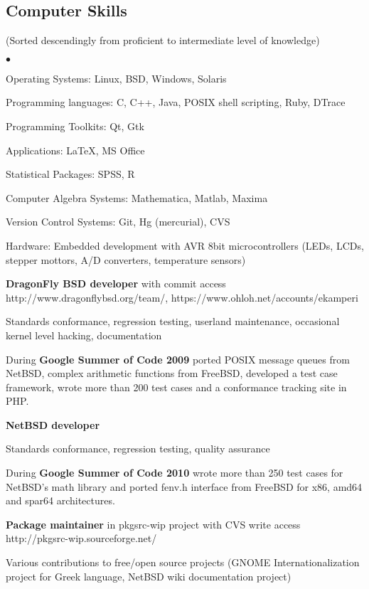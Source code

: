 \documentclass[margin,line]{res}
\newenvironment{list2}{
  \begin{list}{$\bullet$}{%
      \setlength{\itemsep}{0in}
      \setlength{\parsep}{0in} \setlength{\parskip}{0in}
      \setlength{\topsep}{0in} \setlength{\partopsep}{0in}
      \setlength{\leftmargin}{0.2in}}}{\end{list}}
\newenvironment{list3}{
  \begin{list}{
      \setlength{\leftmargin}{0.25in}}}{\end{list}}
\begin{document}
\begin{resume}
\section{\sc Computer Skills}
\small (Sorted descendingly from proficient to intermediate level of knowledge)
\normalsize
\begin{list2}
\item Operating Systems: Linux, BSD, Windows, Solaris
\item Programming languages: C, C++, Java, POSIX shell scripting, Ruby, DTrace
\item Programming Toolkits: Qt, Gtk
\item Applications: \LaTeX, MS Office
\item Statistical Packages: SPSS, R
\item Computer Algebra Systems: Mathematica, Matlab, Maxima
\item Version Control Systems: Git, Hg (mercurial), CVS
\item Hardware: Embedded development with AVR 8bit microcontrollers (LEDs, LCDs,
stepper mottors, A/D converters, temperature sensors)
\item {\bf DragonFly BSD developer} with commit access\\\small http://www.dragonflybsd.org/team/,
https://www.ohloh.net/accounts/ekamperi\normalsize
\begin{list3}
\item Standards conformance, regression testing, userland maintenance,
occasional kernel level hacking, documentation
\item During {\bf Google Summer of Code 2009} ported POSIX message queues from
NetBSD, complex arithmetic functions from FreeBSD, developed a test case
framework, wrote more than 200 test cases and a conformance tracking site in PHP.
\end{list3}
\item {\bf NetBSD developer}
\begin{list3}
\item Standards conformance, regression testing, quality assurance
\item During {\bf Google Summer of Code 2010} wrote more than 250 test cases for
NetBSD's math library and ported fenv.h interface from FreeBSD for x86, amd64 and
spar64 architectures.
\end{list3}
\item {\bf Package maintainer} in pkgsrc-wip project with CVS write access \\http://pkgsrc-wip.sourceforge.net/
\item Various contributions to free/open source projects (GNOME Internationalization project for Greek language,
NetBSD wiki documentation project)
\end{list2}


\end{resume}
\end{document}
